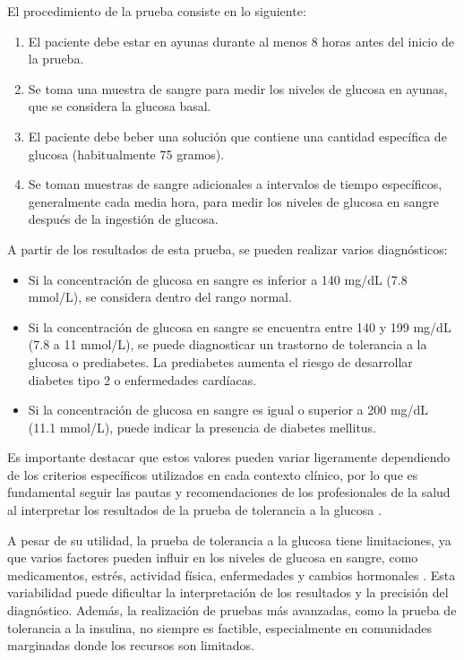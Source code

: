 El procedimiento de la prueba consiste en lo siguiente:

\begin{enumerate}
    \item El paciente debe estar en ayunas durante al menos 8 horas antes del inicio de la prueba.
    \item Se toma una muestra de sangre para medir los niveles de glucosa en ayunas, que se considera la glucosa basal.
    \item El paciente debe beber una solución que contiene una cantidad específica de glucosa (habitualmente 75 gramos).
    \item Se toman muestras de sangre adicionales a intervalos de tiempo específicos, generalmente cada media hora, para medir los niveles de glucosa en sangre después de la ingestión de glucosa.
\end{enumerate}
 
A partir de los resultados de esta prueba, se pueden realizar varios diagnósticos:

\begin{itemize}
    \item Si la concentración de glucosa en sangre es inferior a 140 mg/dL (7.8 mmol/L), se considera dentro del rango normal.
    
    \item Si la concentración de glucosa en sangre se encuentra entre 140 y 199 mg/dL (7.8 a 11 mmol/L), se puede diagnosticar un trastorno de tolerancia a la glucosa o prediabetes. La prediabetes aumenta el riesgo de desarrollar diabetes tipo 2 o enfermedades cardíacas.
    
    \item Si la concentración de glucosa en sangre es igual o superior a 200 mg/dL (11.1 mmol/L), puede indicar la presencia de diabetes mellitus.
\end{itemize}

Es importante destacar que estos valores pueden variar ligeramente dependiendo de los criterios específicos utilizados en cada contexto clínico, por lo que es fundamental seguir las pautas y recomendaciones de los profesionales de la salud al interpretar los resultados de la prueba de tolerancia a la glucosa \cite{testGlu}.

A pesar de su utilidad, la prueba de tolerancia a la glucosa tiene limitaciones, ya que varios factores pueden influir en los niveles de glucosa en sangre, como medicamentos, estrés, actividad física, enfermedades y cambios hormonales \cite{causasGlu}. Esta variabilidad puede dificultar la interpretación de los resultados y la precisión del diagnóstico. Además, la realización de pruebas más avanzadas, como la prueba de tolerancia a la insulina, no siempre es factible, especialmente en comunidades marginadas donde los recursos son limitados.

